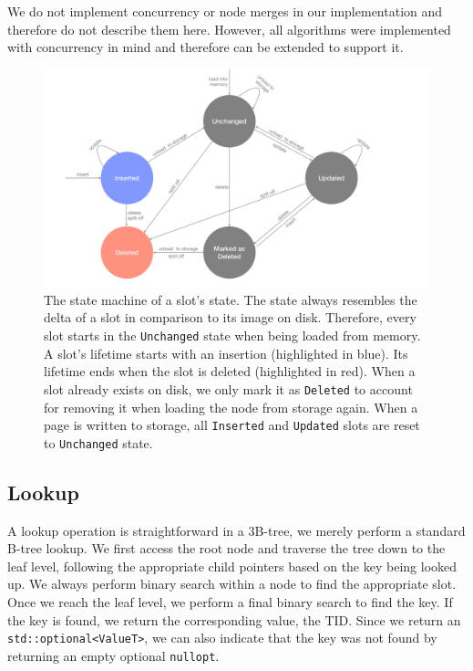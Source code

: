 We do not implement concurrency or node merges in our implementation and therefore do not describe them here.
However, all algorithms were implemented with concurrency in mind and therefore can be extended to support it.

\begin{figure}[htbp]
  \centering
  \includegraphics[width=1\textwidth]{figures/slot_states.pdf}
  \caption{
    The state machine of a slot's state. 
    The state always resembles the delta of a slot in comparison to its image on disk. 
    Therefore, every slot starts in the \texttt{Unchanged} state when being loaded from memory. 
    A slot's lifetime starts with an insertion (highlighted in blue). 
    Its lifetime ends when the slot is deleted (highlighted in red).
    When a slot already exists on disk, we only mark it as \texttt{Deleted} to account for removing it when loading the node from storage again.
    When a page is written to storage, all \texttt{Inserted} and \texttt{Updated} slots are reset to \texttt{Unchanged} state. 
  }
  \label{fig:slot-states}
\end{figure}

\subsection*{Lookup}
A lookup operation is straightforward in a 3B-tree, we merely perform a standard B-tree lookup.
We first access the root node and traverse the tree down to the leaf level, following the appropriate child pointers based on the key being looked up.
We always perform binary search within a node to find the appropriate slot. 
Once we reach the leaf level, we perform a final binary search to find the key.
If the key is found, we return the corresponding value, the \ac{TID}.
Since we return an \texttt{std::optional<ValueT>}, we can also indicate that the key was not found by returning an empty optional \texttt{nullopt}.

